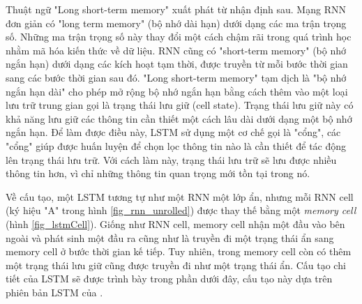 Thuật ngữ "Long short-term memory" xuất phát từ nhận định sau. Mạng RNN đơn giản có "long term memory" (bộ nhớ dài hạn) dưới dạng các ma trận trọng số. Những ma trận trọng số này thay đổi một cách chậm rãi trong quá trình học nhằm mã hóa kiến thức về dữ liệu. RNN cũng có "short-term memory" (bộ nhớ ngắn hạn) dưới dạng các kích hoạt tạm thời, được truyền từ mỗi bước thời gian sang các bước thời gian sau đó. "Long short-term memory" tạm dịch là "bộ nhớ ngắn hạn dài" cho phép mở rộng bộ nhớ ngắn hạn bằng cách thêm vào một loại lưu trữ trung gian gọi là trạng thái lưu giữ (cell state). Trạng thái lưu giữ này có khả năng lưu giữ các thông tin cần thiết một cách lâu dài dưới dạng một bộ nhớ ngắn hạn. Để làm được điều này, LSTM sử dụng một cơ chế gọi là "cổng", các "cổng" giúp được huấn luyện để chọn lọc thông tin nào là cần thiết để tác động lên trạng thái lưu trữ. Với cách làm này, trạng thái lưu trữ sẽ lưu được nhiều thông tin hơn, vì chỉ những thông tin quan trọng mới tồn tại trong nó.

Về cấu tạo, một LSTM tương tự như một RNN một lớp ẩn, nhưng mỗi RNN cell (ký hiệu "A" trong hình \ref{fig_rnn_unrolled}) được thay thế bằng một \textit{memory cell} (hình \ref{fig_lstmCell}). Giống như RNN cell, memory cell nhận một đầu vào bên ngoài và phát sinh một đầu ra cũng như là truyền đi một trạng thái ẩn sang memory cell ở bước thời gian kế tiếp. Tuy nhiên, trong memory cell còn có thêm một trạng thái lưu giữ cũng được truyền đi như một trạng thái ẩn. Cấu tạo chi tiết của LSTM sẽ được trình bày trong phần dưới đây, cấu tạo này dựa trên phiên bản LSTM của \cite{gers2000}.

